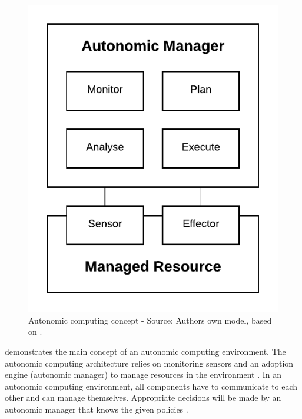 \begin{figure}[h]
\centering
\includegraphics[scale=1]{images/02_theoretical_foundation/autonomic_computing/autonomic_computing_concept}
\caption{Autonomic computing concept - Source: Authors own model, based on \cite{Jacob2004AutonomicSolution}.}
\label{fig:ac_concept}
\end{figure}

 demonstrates the main concept of an autonomic computing environment. The autonomic computing architecture relies on monitoring sensors and an adoption engine (autonomic manager) to manage resources in the environment \cite{Goscinski2011CloudComputing}.
In an autonomic computing environment, all components have to communicate to each other and can manage themselves. Appropriate decisions will be made by an autonomic manager that knows the given policies \cite{Jacob2004AutonomicSolution}.

